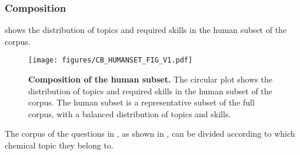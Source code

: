 \subsubsection{Composition}

 shows the distribution of topics and required skills in the human subset of the \chembench corpus.

\begin{figure}
    \centering
    \texttt{[image: figures/CB\_HUMANSET\_FIG\_V1.pdf]}
    \caption{\textbf{Composition of the human subset.} The circular plot shows the distribution of topics and required skills in the human subset of the \chembench corpus. The human subset is a representative subset of the full corpus, with a balanced distribution of topics and skills.}
    \label{fig:cb_humanset}
\end{figure}

The corpus of the questions in \chembench, as shown in , can be divided according to which chemical topic they belong to.

